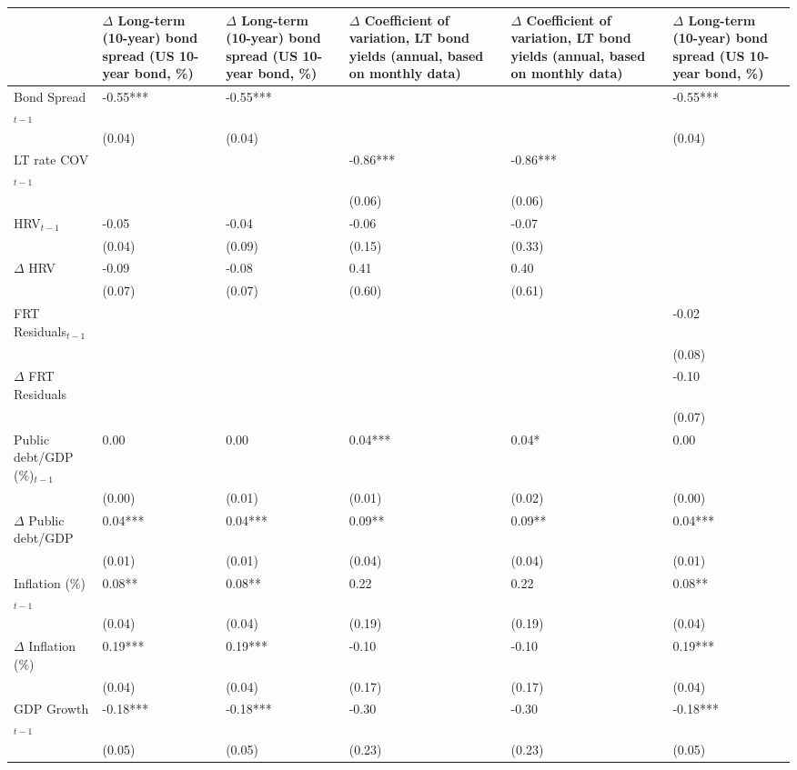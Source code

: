 \begingroup\tiny
\begin{tabular}{lp{3cm}p{3cm}p{3cm}p{3cm}p{3cm}}
  \hline
 & $\Delta$ Long-term (10-year) bond spread (US 10-year bond, \%) & $\Delta$ Long-term (10-year) bond spread (US 10-year bond, \%) & $\Delta$ Coefficient of variation, LT bond yields (annual, based on monthly data) & $\Delta$ Coefficient of variation, LT bond yields (annual, based on monthly data) & $\Delta$ Long-term (10-year) bond spread (US 10-year bond, \%) \\ 
  \hline
Bond Spread$_{t-1}$ & -0.55*** & -0.55*** &  &  & -0.55*** \\ 
   & (0.04) & (0.04) &  &  & (0.04) \\ 
  LT rate COV$_{t-1}$ &  &  & -0.86*** & -0.86*** &  \\ 
   &  &  & (0.06) & (0.06) &  \\ 
  HRV$_{t-1}$ & -0.05 & -0.04 & -0.06 & -0.07 &  \\ 
   & (0.04) & (0.09) & (0.15) & (0.33) &  \\ 
  $\Delta$ HRV & -0.09 & -0.08 & 0.41 & 0.40 &  \\ 
   & (0.07) & (0.07) & (0.60) & (0.61) &  \\ 
  FRT Residuals$_{t-1}$ &  &  &  &  & -0.02 \\ 
   &  &  &  &  & (0.08) \\ 
  $\Delta$ FRT Residuals &  &  &  &  & -0.10 \\ 
   &  &  &  &  & (0.07) \\ 
  Public debt/GDP (\%)$_{t-1}$ & 0.00 & 0.00 & 0.04*** & 0.04* & 0.00 \\ 
   & (0.00) & (0.01) & (0.01) & (0.02) & (0.00) \\ 
  $\Delta$ Public debt/GDP & 0.04*** & 0.04*** & 0.09** & 0.09** & 0.04*** \\ 
   & (0.01) & (0.01) & (0.04) & (0.04) & (0.01) \\ 
  Inflation (\%) $_{t-1}$ & 0.08** & 0.08** & 0.22 & 0.22 & 0.08** \\ 
   & (0.04) & (0.04) & (0.19) & (0.19) & (0.04) \\ 
  $\Delta$ Inflation (\%) & 0.19*** & 0.19*** & -0.10 & -0.10 & 0.19*** \\ 
   & (0.04) & (0.04) & (0.17) & (0.17) & (0.04) \\ 
  GDP Growth$_{t-1}$ & -0.18*** & -0.18*** & -0.30 & -0.30 & -0.18*** \\ 
   & (0.05) & (0.05) & (0.23) & (0.23) & (0.05) \\ 

\end{tabular}
